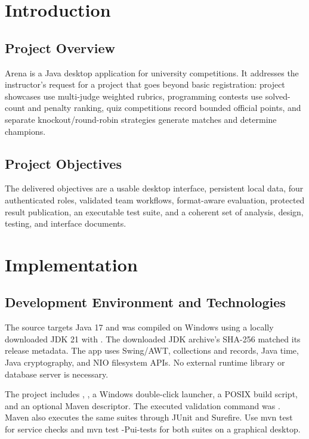 \documentclass[12pt]{article}
\begin{document}
\section{Introduction}
\subsection{Project Overview}
Arena is a Java desktop application for university competitions. It addresses the instructor's request for a project that goes beyond basic registration: project showcases use multi-judge weighted rubrics, programming contests use solved-count and penalty ranking, quiz competitions record bounded official points, and separate knockout/round-robin strategies generate matches and determine champions.
\subsection{Project Objectives}
The delivered objectives are a usable desktop interface, persistent local data, four authenticated roles, validated team workflows, format-aware evaluation, protected result publication, an executable test suite, and a coherent set of analysis, design, testing, and interface documents.

\section{Implementation}
\subsection{Development Environment and Technologies}
The source targets Java 17 and was compiled on Windows using a locally downloaded JDK 21 with . The downloaded JDK archive's SHA-256 matched its release metadata. The app uses Swing/AWT, collections and records, Java time, Java cryptography, and NIO filesystem APIs. No external runtime library or database server is necessary.

The project includes , , a Windows double-click launcher, a POSIX build script, and an optional Maven descriptor. The executed validation command was . Maven also executes the same suites through JUnit and Surefire. Use mvn test for service checks and mvn test -Pui-tests for both suites on a graphical desktop.
\end{document}
